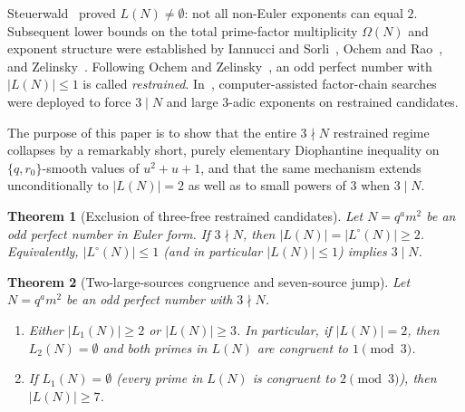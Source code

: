 \documentclass[11pt]{amsart}
\newtheorem{theorem}{Theorem}
\theoremstyle{definition}
\theoremstyle{remark}
\begin{document}
Steuerwald~\cite{Steuerwald1937} proved $L(N) \ne \emptyset$: not all non-Euler exponents can equal $2$. Subsequent lower bounds on the total prime-factor multiplicity $\Omega(N)$ and exponent structure were established by Iannucci and Sorli~\cite{IannucciSorli2003}, Ochem and Rao~\cite{OchemRao2014}, and Zelinsky~\cite{Zelinsky2021}. Following Ochem and Zelinsky~\cite{OchemZelinsky2026}, an odd perfect number with $|L(N)| \le 1$ is called \emph{restrained}. In~\cite{OchemZelinsky2026}, computer-assisted factor-chain searches were deployed to force $3 \mid N$ and large $3$-adic exponents on restrained candidates.

The purpose of this paper is to show that the entire $3 \nmid N$ restrained regime collapses by a remarkably short, purely elementary Diophantine inequality on $\{q, r_0\}$-smooth values of $u^2 + u + 1$, and that the same mechanism extends unconditionally to $|L(N)| = 2$ as well as to small powers of $3$ when $3 \mid N$.

\begin{theorem}[Exclusion of three-free restrained candidates]\label{thm:three-free-restrained}
Let $N = q^a m^2$ be an odd perfect number in Euler form. If $3 \nmid N$, then $|L(N)| = |L^\circ(N)| \ge 2$. Equivalently, $|L^\circ(N)| \le 1$ (and in particular $|L(N)| \le 1$) implies $3 \mid N$.
\end{theorem}

\begin{theorem}[Two-large-sources congruence and seven-source jump]\label{thm:two-sources}
Let $N = q^a m^2$ be an odd perfect number with $3 \nmid N$.
\begin{enumerate}
  \item Either $|L_1(N)| \ge 2$ or $|L(N)| \ge 3$. In particular, if $|L(N)| = 2$, then $L_2(N) = \emptyset$ and both primes in $L(N)$ are congruent to $1 \pmod 3$.
  \item If $L_1(N) = \emptyset$ (every prime in $L(N)$ is congruent to $2 \pmod 3$), then $|L(N)| \ge 7$.
\end{enumerate}
\end{theorem}
\end{document}
